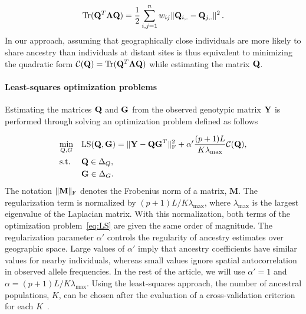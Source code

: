 $$
 {\rm Tr} ({\bf Q}^T {\bf \Lambda} {\bf Q})  = \frac12 \sum_{i,j = 1}^n  w_{ij}  \|   {\bf Q}_{i,.}  - {\bf Q}_{j,.} \|^2 \, .
$$
In our approach, assuming that geographically close individuals are more likely to share ancestry than individuals at distant sites is thus equivalent to minimizing the quadratic form ${\cal C}({\bf Q}) ={\rm Tr} ({\bf Q}^T {\bf \Lambda} {\bf Q})$ while estimating the matrix ${\bf Q}$. 

\paragraph{Least-squares optimization problems} Estimating the matrices ${\bf Q}$ and ${\bf G }$ from the observed genotypic matrix ${\bf Y}$ is performed through solving an optimization problem defined as follows~\citep{Caye2016}

\begin{equation}
\begin{aligned}
& \underset{Q, G}{\text{min}}
& & {\rm LS}({\bf Q}, {\bf G}) =   \|  {\bf Y} - {\bf QG}^T \|^2_{\rm F} +  \alpha ' \frac{(p+1)L}{K \lambda_{\max}} {\cal C}({\bf Q}) , \\
& \text{s.t.} & &  {\bf Q} \in \Delta_Q , \\
& & &  {\bf G} \in \Delta_G . \\
\end{aligned}
\label{eq:LS}
\end{equation}
 \noindent The notation $\|  {\bf M}  \|_{\rm F}$ denotes the Frobenius norm of a matrix, {\bf M}. The regularization term is normalized by $(p+1)L/K \lambda_{\max}$, where $\lambda_{\max}$ is the largest eigenvalue of the Laplacian matrix. With this normalization, both terms of the optimization problem~\eqref{eq:LS} are given the same order of magnitude. The regularization parameter $\alpha ' $ controls the regularity of ancestry estimates over geographic space.  Large values of $\alpha ' $ imply that ancestry coefficients have similar values for nearby individuals, whereas small values ignore spatial autocorrelation in observed allele frequencies. In the rest of the article, we will use $\alpha ' = 1$ and $\alpha = (p+1)L/K \lambda_{\max}$. Using the least-squares approach, the number of ancestral populations, $K$, can be chosen after the evaluation of a cross-validation criterion for each $K$~\citep{Alexander2011, Frichot2014, Frichot2015}.


